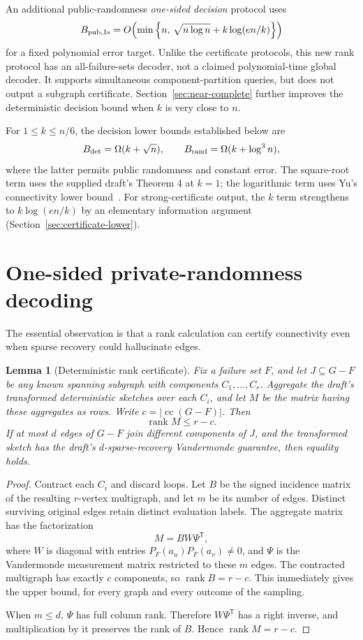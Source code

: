 \documentclass[11pt]{article}
\newtheorem{lemma}[theorem]{Lemma}
\theoremstyle{remark}\newtheorem{remark}[theorem]{Remark}
\newcommand{\rank}{\operatorname{rank}}
\newcommand{\cc}{\operatorname{cc}}
\begin{document}
An additional public-randomness \emph{one-sided decision} protocol uses
\[
 B_{\rm pub,1s}=O\!\left(\min\left\{n,\,
 \sqrt{n\log n}+k\log(en/k)\right\}\right)
\]
for a fixed polynomial error target. Unlike the certificate protocols, this new rank protocol has an all-failure-sets decoder, not a claimed polynomial-time global decoder. It supports simultaneous component-partition queries, but does not output a subgraph certificate. Section~\ref{sec:near-complete} further improves the deterministic decision bound when $k$ is very close to $n$.

For $1\le k\le n/6$, the decision lower bounds established below are
\[
 B_{\rm det}=\Omega(k+\sqrt n),\qquad
 B_{\rm rand}=\Omega(k+\log^3n),
\]
where the latter permits public randomness and constant error. The square-root term uses the supplied draft's Theorem 4 at $k=1$; the logarithmic term uses Yu's connectivity lower bound~\cite{Yu21}. For strong-certificate output, the $k$ term strengthens to $k\log(en/k)$ by an elementary information argument (Section~\ref{sec:certificate-lower}).

\section{One-sided private-randomness decoding}
The essential observation is that a rank calculation can certify connectivity even when sparse recovery could hallucinate edges.

\begin{lemma}[Deterministic rank certificate]\label{lem:rank}
Fix a failure set $F$, and let $J\subseteq G-F$ be any known spanning subgraph with components $C_1,\ldots,C_r$. Aggregate the draft's transformed deterministic sketches over each $C_i$, and let $M$ be the matrix having these aggregates as rows. Write $c=|\cc(G-F)|$. Then
\[
 \rank M\le r-c.
\]
If at most $d$ edges of $G-F$ join different components of $J$, and the transformed sketch has the draft's $d$-sparse-recovery Vandermonde guarantee, then equality holds.
\end{lemma}
\begin{proof}
Contract each $C_i$ and discard loops. Let $B$ be the signed incidence matrix of the resulting $r$-vertex multigraph, and let $m$ be its number of edges. Distinct surviving original edges retain distinct evaluation labels. The aggregate matrix has the factorization
\[
 M=BW\Psi^{\mathsf T},
\]
where $W$ is diagonal with entries $P_F(a_u)P_F(a_v)\ne0$, and $\Psi$ is the Vandermonde measurement matrix restricted to these $m$ edges. The contracted multigraph has exactly $c$ components, so $\rank B=r-c$. This immediately gives the upper bound, for every graph and every outcome of the sampling.

When $m\le d$, $\Psi$ has full column rank. Therefore $W\Psi^{\mathsf T}$ has a right inverse, and multiplication by it preserves the rank of $B$. Hence $\rank M=r-c$.
\end{proof}
\end{document}
